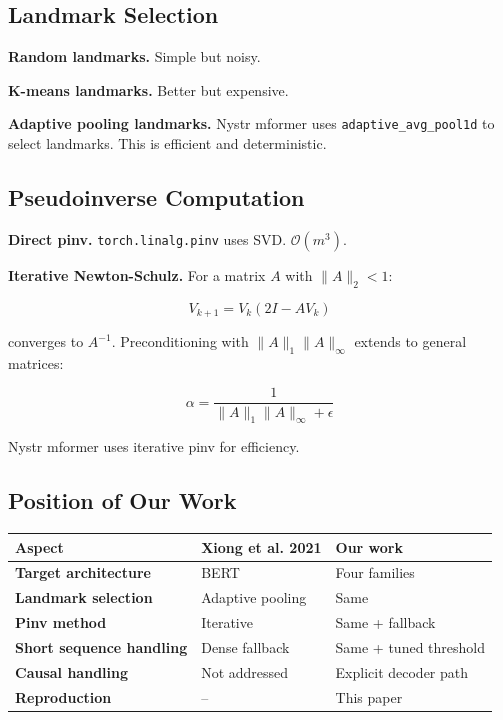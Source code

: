 \subsection{Landmark Selection}

\textbf{Random landmarks.} Simple but noisy.

\textbf{K-means landmarks.} Better but expensive.

\textbf{Adaptive pooling landmarks.} Nystr mformer uses \texttt{adaptive\_avg\_pool1d} 
to select landmarks. This is efficient and deterministic.

\subsection{Pseudoinverse Computation}

\textbf{Direct pinv.} \texttt{torch.linalg.pinv} uses SVD. $\mathcal{O}(m^3)$.

\textbf{Iterative Newton-Schulz.} For a matrix $A$ with $\|A\|_2 < 1$:

\[
V_{k+1} = V_k (2I - A V_k)
\tag{2.2}
\]

converges to $A^{-1}$. Preconditioning with $\|A\|_1 \|A\|_\infty$ 
extends to general matrices:

\[
\alpha = \frac{1}{\|A\|_1 \|A\|_\infty + \epsilon}
\tag{2.3}
\]

Nystr mformer uses iterative pinv for efficiency.

\subsection{Position of Our Work}

\begin{table}[H]
\centering
\small
\begin{tabular}{lll}
\toprule
\textbf{Aspect} & \textbf{Xiong et al. 2021} & \textbf{Our work} \\
\midrule
\textbf{Target architecture} & BERT & Four families \\
\textbf{Landmark selection} & Adaptive pooling & Same \\
\textbf{Pinv method} & Iterative & Same + fallback \\
\textbf{Short sequence handling} & Dense fallback & Same + tuned threshold \\
\textbf{Causal handling} & Not addressed & Explicit decoder path \\
\textbf{Reproduction} & -- & This paper \\
\bottomrule
\end{tabular}
\end{table}

